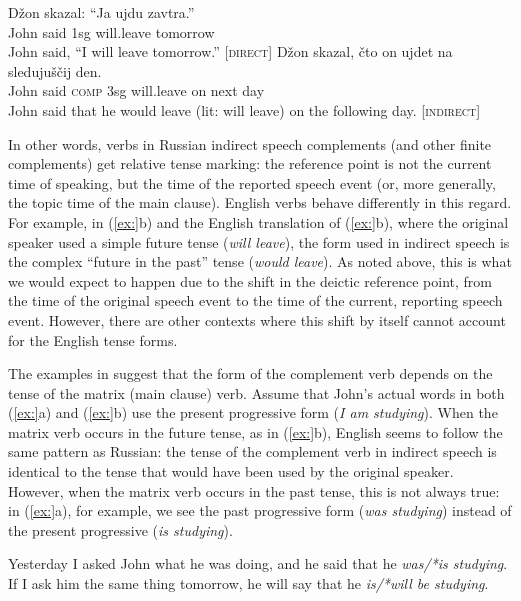 \ea
\ea  \gll Džon  skazal:  “Ja  ujdu  zavtra.”\\
John  said  1sg  will.leave  tomorrow\\
\glt John said, “I will leave tomorrow.”  [\textsc{direct}]
\ex \gll Džon  skazal,  čto  on  ujdet  na  sledujuščij  den.\\
John  said  \textsc{comp}  3sg  will.leave  on  next  day\\
\glt John said that he would leave (lit: will leave) on the following day.  [\textsc{indirect}]
\z \z


In other words, verbs in Russian indirect speech complements (and other finite complements) get relative tense marking: the reference point is not the current time of speaking, but the time of the reported speech event (or, more generally, the topic time of the main clause). English verbs behave differently in this regard. For example, in (\ref{ex:}b) and the English translation of (\ref{ex:}b), where the original speaker used a simple future tense (\textit{will leave}), the form used in indirect speech is the complex “future in the past” tense (\textit{would leave}). As noted above, this is what we would expect to happen due to the shift in the deictic reference point, from the time of the original speech event to the time of the current, reporting speech event. However, there are other contexts where this shift by itself cannot account for the English tense forms.



The examples in  suggest that the form of the complement verb depends on the tense of the matrix (main clause) verb. Assume that John’s actual words in both (\ref{ex:}a) and (\ref{ex:}b) use the present progressive form (\textit{I am studying}). When the matrix verb occurs in the future tense, as in (\ref{ex:}b), English seems to follow the same pattern as Russian: the tense of the complement verb in indirect speech is identical to the tense that would have been used by the original speaker. However, when the matrix verb occurs in the past tense, this is not always true: in (\ref{ex:}a), for example, we see the past progressive form (\textit{was studying}) instead of the present progressive (\textit{is studying}).


\ea
\ea Yesterday I asked John what he was doing, and he said that he \textit{was/*is studying}.\\
\ex If I ask him the same thing tomorrow, he will say that he \textit{is/*will be studying}.
                       \z
\z


